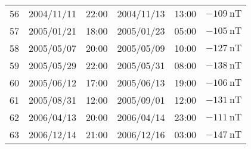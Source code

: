 \begin{table}[ht]
\begin{adjustbox}{width=\textwidth,totalheight=0.9\textheight,keepaspectratio}
\begin{tabular}{cccccc}
    56 & 2004/11/11 & 22:00 & 2004/11/13 & 13:00 & $ \SI{-109}{\nano\tesla}$ \\
    57 & 2005/01/21 & 18:00 & 2005/01/23 & 05:00 & $ \SI{-105}{\nano\tesla}$ \\
    58 & 2005/05/07 & 20:00 & 2005/05/09 & 10:00 & $ \SI{-127}{\nano\tesla}$ \\
    59 & 2005/05/29 & 22:00 & 2005/05/31 & 08:00 & $ \SI{-138}{\nano\tesla}$ \\
    60 & 2005/06/12 & 17:00 & 2005/06/13 & 19:00 & $ \SI{-106}{\nano\tesla}$ \\
    61 & 2005/08/31 & 12:00 & 2005/09/01 & 12:00 & $ \SI{-131}{\nano\tesla}$ \\
    62 & 2006/04/13 & 20:00 & 2006/04/14 & 23:00 & $ \SI{-111}{\nano\tesla}$ \\
    63 & 2006/12/14 & 21:00 & 2006/12/16 & 03:00 & $ \SI{-147}{\nano\tesla}$ \\ \hline
    \end{tabular}%
    \end{adjustbox}
    \end{table}
    

%
%

